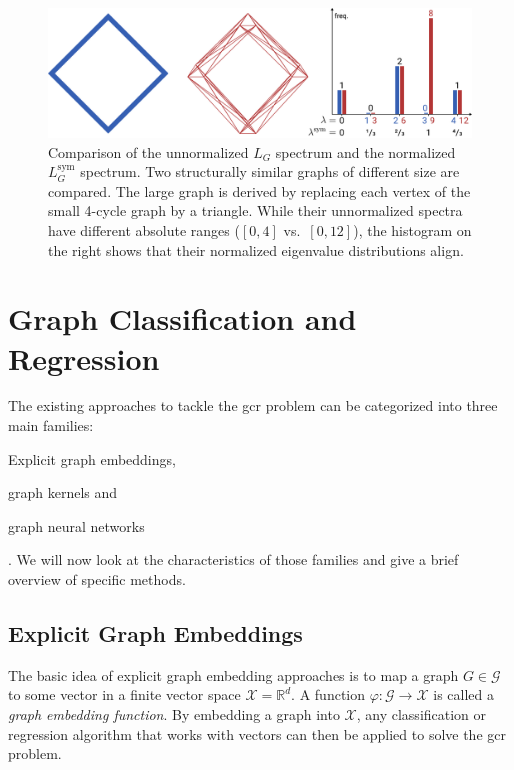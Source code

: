 \begin{figure}[ht]
	\centering
	\includegraphics[width=\linewidth]{gfx/related-work/spectral-normalization.pdf}
	\caption[Comparison of the unnormalized $L_G$ spectrum and the normalized $L^{\text{sym}}_G$ spectrum.]{
		Comparison of the unnormalized $L_G$ spectrum and the normalized $L^{\text{sym}}_G$ spectrum.
		Two structurally similar graphs of different size are compared.
		The \textcolor{t_red}{large graph} is derived by replacing each vertex of the \textcolor{t_blue}{small 4-cycle graph} by a triangle.
		While their unnormalized spectra have different absolute ranges (\textcolor{t_blue}{$[0, 4]$} vs.\ \textcolor{t_red}{$[0, 12]$}), the histogram on the right shows that their normalized eigenvalue distributions align.
	}\label{fig:related:spectral-normalization}
\end{figure}

\section{Graph Classification and Regression}%
\label{sec:related:gcr}

The existing approaches to tackle the \ac{gcr} problem can be categorized into three main families:
\begin{enumerate*}
	\item Explicit graph embeddings,
	\item graph kernels and
	\item graph neural networks
\end{enumerate*}.
We will now look at the characteristics of those families and give a brief overview of specific methods.

\subsection{Explicit Graph Embeddings}%
\label{sec:related:gcr:embed}

The basic idea of explicit graph embedding approaches is to map a graph $G \in \mathcal{G}$ to some vector in a finite vector space $\mathcal{X} = \mathbb{R}^d$.
A function $\varphi: \mathcal{G} \to \mathcal{X}$ is called a \textit{graph embedding function}.
By embedding a graph into $\mathcal{X}$, any classification or regression algorithm that works with vectors can then be applied to solve the \ac{gcr} problem.

